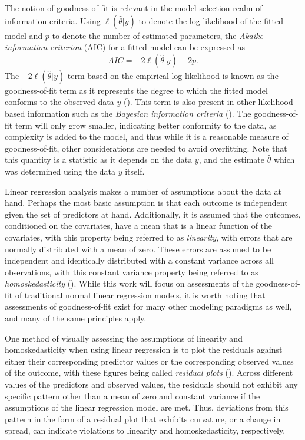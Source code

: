 \documentclass[12pt]{article} %
\theoremstyle{definition}
\begin{document}
		The notion of goodness-of-fit is relevant in the model selection realm of information criteria. Using $\ell(\hat{\theta}|y)$ to denote the log-likelihood of the fitted model and $p$ to denote the
		number of estimated parameters, the \textit{Akaike information criterion} (AIC) for a fitted model can be expressed as
		\begin{equation*}
			AIC = -2 \ell(\hat{\theta}|y) + 2 p.
		\end{equation*}
		The $-2 \ell(\hat{\theta}|y)$ term based on the empirical log-likelihood is known as the goodness-of-fit term as it represents the degree to which the fitted model
		conforms to the observed data $y$ (\cite{Cavanaugh}). This term is also present in other likelihood-based information such as the \textit{Bayesian information criteria} (\cite{Schwarz}). The goodness-of-fit
		term will only grow smaller, indicating better conformity to the data, as complexity is added to the model, and thus while it is a reasonable measure of goodness-of-fit, other considerations are needed to avoid overfitting. Note that this
		quantity is a statistic as it depends on the data $y$, and the estimate $\hat{\theta}$ which was determined using the data $y$ itself.

		Linear regression analysis makes a number of assumptions about the data at hand. Perhaps the most basic assumption is that each outcome is independent given the set of predictors at hand.
		Additionally, it is assumed that the outcomes, conditioned on the covariates, have a mean that is a linear function of the covariates, with this property being referred to as \textit{linearity},
		with errors that are normally distributed with a mean of zero. These errors are assumed to be independent and identically distributed with a constant variance across all observations, with this
		constant variance property being referred to as \textit{homoskedasticity} (\cite{Kutner}). While this work will focus on assessments of the goodness-of-fit of traditional normal linear regression models, it is worth noting
		that assessments of goodness-of-fit exist for many other modeling paradigms as well, and many of the same principles apply.
		
		One method of visually assessing the assumptions of linearity and homoskedasticity when using linear
		regression is to plot the residuals against either their corresponding predictor values or the corresponding observed values of the outcome, with these figures being called \textit{residual plots} (\cite{Miles}). Across different values
		of the predictors and observed values, the residuals should not exhibit any specific pattern other than a mean of zero and constant variance if the assumptions of the linear regression model are met.
		Thus, deviations from this pattern in the form of a residual plot that exhibits curvature, or a change in spread, can indicate violations
		to linearity and homoskedasticity, respectively. 
\end{document}
